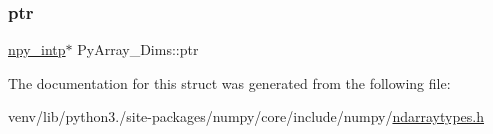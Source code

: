 \mbox{\label{structPyArray__Dims_acc9b33c71575f3e05cc973fb6dac6764}} 
\subsubsection{\texorpdfstring{ptr}{ptr}}
{\footnotesize\ttfamily \hyperlink{npy__common_8h_a2d6effc4d5ecb85675ebfcfaa102b483}{npy\+\_\+intp}$\ast$ Py\+Array\+\_\+\+Dims\+::ptr}



The documentation for this struct was generated from the following file\+:\begin{DoxyCompactItemize}
\item 
venv/lib/python3./site-\/packages/numpy/core/include/numpy/\hyperlink{ndarraytypes_8h}{ndarraytypes.\+h}\end{DoxyCompactItemize}
